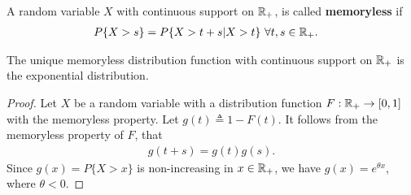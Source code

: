 \documentclass[a4paper,10pt,english]{article}
\begin{document}
A random variable $X$ with continuous support on $\mathbb{R}_+$, is called \textbf{memoryless} if %
\begin{align*}
  P\{X>s\} &= P\{ X > t+s| X>t\}~\forall t,s \in \R_+.%
\end{align*}
\begin{prop} The unique memoryless distribution function with continuous support on $\mathbb{R}_+$ is the exponential distribution.
\end{prop}
\begin{proof}
Let $X$ be a random variable with a distribution function $F: \mathbb{R}_+ \to [0,1]$ with the memoryless property. 
Let $g(t) \triangleq 1 - F(t)$. It follows from the memoryless property of $F$, that
\begin{align*}
 g(t+s) = g(t)g(s).
\end{align*}
%
Since $g(x) = P\{X > x\}$  is non-increasing in $x \in \mathbb{R}_+$, we have $g(x) = e^{\theta x}$, where $\theta < 0$.
\end{proof}
\end{document}

